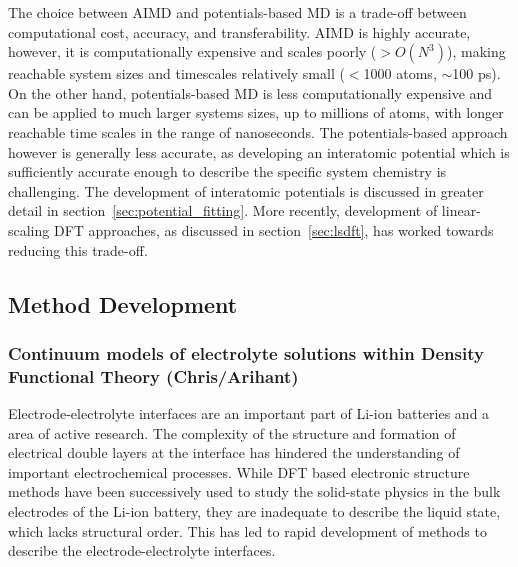 \documentclass[../main.tex]{subfiles}
\begin{document}
The choice between AIMD and potentials-based MD is a trade-off between computational cost, accuracy, and transferability. AIMD is highly accurate, however, it is computationally expensive and scales poorly ($>O(N^3)$), making reachable system sizes and timescales relatively small ($<$1000 atoms, $\sim$100 ps). On the other hand, potentials-based MD is less computationally expensive and can be applied to much larger systems sizes, up to millions of atoms, with longer reachable time scales in the range of nanoseconds. The potentials-based approach however is generally less accurate, as developing an interatomic potential which is sufficiently accurate enough to describe the specific system chemistry is challenging. The development of interatomic potentials is discussed in greater detail in section~\ref{sec:potential_fitting}. More recently, development of linear-scaling DFT approaches, as discussed in section~\ref{sec:lsdft}, has worked towards reducing this trade-off.

\subsection{Method Development}

\subsubsection{Continuum models of electrolyte solutions within Density Functional Theory (Chris/Arihant)}
\label{sec:dft+cont}
Electrode-electrolyte interfaces are an important part of Li-ion batteries and a area of active research.\cite{Gauthier2015, yu2018electrode} The complexity of the structure and formation of electrical double layers at the interface has hindered the understanding of important electrochemical processes. While DFT based electronic structure methods have been successively used to study the solid-state physics in the bulk electrodes of the Li-ion battery, they are inadequate to describe the liquid state, which lacks structural order. This has led to rapid development of methods to describe the electrode-electrolyte interfaces.\cite{Jinnouchi2018} 
\end{document}
